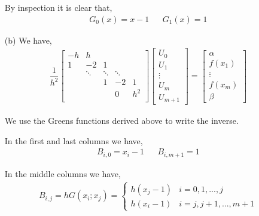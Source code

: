 \documentclass[10pt]{article}
\begin{document}
\begin{solution}[Solution]
\begin{enumerate}
        
        By inspection it is clear that,
        \begin{align*}
            G_0(x) = x-1 && G_1(x) = 1
        \end{align*}
    \item[(b)]
        We have,
        \begin{align*}
            \dfrac{1}{h^2}
            \left[\begin{array}{rrrrr}
                -h & h \\
                1 & -2 & 1 \\
                & \ddots & \ddots & \ddots \\
                & & 1 & -2 & 1 \\
                & & & 0 & h^2 \\
            \end{array}\right]
            \left[\begin{array}{c}
                U_0 \\ U_1 \\ \vdots \\ U_m \\ U_{m+1}
            \end{array}\right]
            =
            \left[\begin{array}{c}
                \alpha \\ f(x_1) \\ \vdots \\ f(x_m) \\ \beta 
            \end{array}\right]
        \end{align*}

        We use the Greens functions derived above to write the inverse. 

        In the first and last columns we have,
        \begin{align*}
            B_{i,0} = x_i - 1
            && 
            B_{i,m+1} = 1
        \end{align*}

        In the middle columns we have,
        \begin{align*}
            B_{i,j} = hG(x_i;x_j) = \begin{cases}
                h(x_j-1) & i = 0,1,...,j \\
                h(x_i-1) & i = j,j+1, ..., m+1
            \end{cases}
        \end{align*}


\end{enumerate}
\end{solution}
\end{document}
